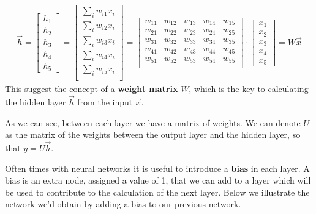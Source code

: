 \documentclass[12pt,letterpaper]{book}
\theoremstyle{definition}
\begin{document}
  \begin{align}
    \vec{h}=
    \begin{bmatrix}
      h_{1} \\
      h_{2} \\
      h_{3} \\
      h_{4} \\
      h_{5}
    \end{bmatrix}
    = \begin{bmatrix}
      \sum_{i}w_{i1}x_i \\
      \sum_{i}w_{i2}x_i \\
      \sum_{i}w_{i3}x_i \\
      \sum_{i}w_{i4}x_i \\
      \sum_{i}w_{i5}x_i \\
    \end{bmatrix}
    = \begin{bmatrix}
      w_{11} & w_{12} & w_{13} & w_{14} & w_{15} \\
      w_{21} & w_{22} & w_{23} & w_{24} & w_{25} \\
      w_{31} & w_{32} & w_{33} & w_{34} & w_{35} \\
      w_{41} & w_{42} & w_{43} & w_{44} & w_{45} \\
      w_{51} & w_{52} & w_{53} & w_{54} & w_{55} \\
    \end{bmatrix}
    \cdot
    \begin{bmatrix}
      x_{1} \\
      x_{2} \\
      x_{3} \\
      x_{4} \\
      x_{5}
    \end{bmatrix}
    = 
    W\vec{x}
  \end{align}
  This suggest the concept of a \textbf{weight matrix} $W$, which is the key to calculating the 
  hidden layer $\vec{h}$ from the input $\vec{x}$.

  As we can see, between each layer we have a matrix of weights. We can denote $U$ as the matrix of 
  the weights between the output layer and the hidden layer, so that 
  $y = U\vec{h}$. 

  Often times with neural networks it is useful to introduce a \textbf{bias} in each layer.   
  A bias is an extra node, assigned a value of 1, that we can add to a layer 
  which will be used to contribute to the calculation of the next layer. Below we illustrate the network 
  we'd obtain by adding a bias to our previous network.
\end{document}
